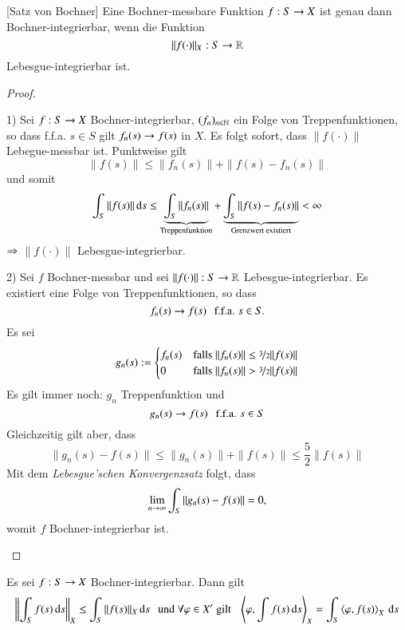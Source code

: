 \begin{theorem}\label{4.26}[Satz von Bochner]
    Eine Bochner-messbare Funktion $f: S\rightarrow X$ ist genau dann Bochner-integrierbar, wenn die Funktion
    \[
        \|f(\cdot)\|_X :S \rightarrow \mathbb{R}
    \]
    Lebesgue-integrierbar ist.
\end{theorem}

\begin{proof}
    \begin{description}
    \item{1)}
    Sei $f:S\rightarrow X$ Bochner-integrierbar, $(f_n)_{n\in \mathbb{N}}$ ein Folge von Treppenfunktionen, so dass
    f.f.a. $s\in S$ gilt $f_n(s)\rightarrow f(s)$ in $X$. Es folgt sofort, dass $\|f(\cdot)\|$ Lebegue-messbar
     ist. Punktweise gilt
     \[
        \|f(s)\|\leq \|f_n(s)\|+ \|f(s)-f_n(s)\|
     \]
     und somit
     \[
        \int_S\|f(s)\|\, \mathrm{d} s\leq \underbrace{\int_S\|f_n(s)\|}_{\text{Treppenfunktion}}
            + \underbrace{\int_S\|f(s)-f_n(s)\|}_{\text{Grenzwert existiert}}<\infty
     \]
    $\Rightarrow$ $\|f(\cdot)\|$ Lebesgue-integrierbar.
    \item{2)}
    Sei $f$ Bochner-messbar und sei $\|f(\cdot)\|:S \rightarrow \mathbb{R}$ Lebesgue-integrierbar. Es existiert eine
    Folge von Treppenfunktionen, so dass
    \[
        f_n(s) \rightarrow f(s) \hspace{.25cm} \text{f.f.a. } s\in S .
    \]
    Es sei
    \[
        g_n(s):= \begin{cases} f_n(s)& \text{falls } \|f_n(s)\|\leq \nicefrac32 \|f(s)\| \\
                 0&\text{falls } \|f_n(s)\|>\nicefrac32 \|f(s)\|\end{cases}
    \]
    Es gilt immer noch: $g_n$ Treppenfunktion und
    \[
        g_n(s)\rightarrow f(s) \hspace{.25cm} \text{f.f.a. } s\in S
    \]
    Gleichzeitig gilt aber, dass
    \[
        \|g_n(s)-f(s)\|\leq \|g_n(s)\|+\|f(s)\| \leq \frac52\|f(s)\|
    \]
    Mit dem \textit{Lebesgue'schen Konvergenzsatz} folgt, dass
    \[
        \lim_{n\rightarrow\infty} \int_S \|g_n(s)-f(s)\|=0,
    \]
    womit $f$ Bochner-integrierbar ist. 
    \end{description}    
    \[ \]
\end{proof}

\begin{cor}\label{4.27}
    Es sei $f:S\rightarrow X$ Bochner-integrierbar. Dann gilt
    \[
        \left\| \int_S f(s)\, \mathrm{d} s \right\|_X\leq\int_S\|f(s)\|_X \, \mathrm{d} s \hspace{.25cm}  \text{und } \forall \varphi \in X'
        \text{ gilt} \hspace{.25cm}\left\langle \varphi, \int f(s)\, \mathrm{d} s \right\rangle _X = \int_S \left\langle \varphi, f(s)\right\rangle_X \, \mathrm{d} s
    \]
\end{cor}

